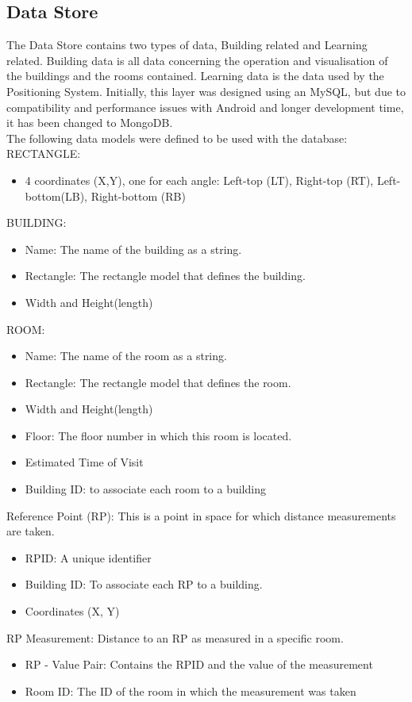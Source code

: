 \subsection{Data Store}
The Data Store contains two types of data, Building related and Learning related. 
Building data is all data concerning the operation and visualisation of the buildings and the rooms contained. Learning data is the data used by the Positioning System.
Initially, this layer was designed using an MySQL, but due to compatibility and performance issues with Android and longer development time, it has been changed to MongoDB.
\\
The following data models were defined to be used with the database:
\\
RECTANGLE:	
\begin{itemize}
	\item 4 coordinates (X,Y), one for each angle: Left-top (LT), Right-top (RT), Left-bottom(LB), Right-bottom (RB)
\end{itemize}

BUILDING:
\begin{itemize}
	\item Name: The name of the building as a string.
	\item Rectangle: The rectangle model that defines the building.
	\item Width and Height(length)
\end{itemize}


ROOM: 
\begin{itemize}
	\item Name: The name of the room as a string.
	\item Rectangle: The rectangle model that defines the room.
	\item Width and Height(length)
	\item Floor: The floor number in which this room is located.
	\item Estimated Time of Visit
	\item Building ID: to associate each room to a building
\end{itemize}

Reference Point (RP): This is a point in space for which distance measurements are taken.
\begin{itemize}
	\item RPID: A unique identifier
	\item Building ID: To associate each RP to a building.
	\item Coordinates (X, Y)
\end{itemize}

RP Measurement: Distance to an RP as measured in a specific room.
\begin{itemize}
	\item RP - Value Pair: Contains the RPID and the value of the measurement
	\item Room ID: The ID of the room in which the measurement was taken
\end{itemize}


